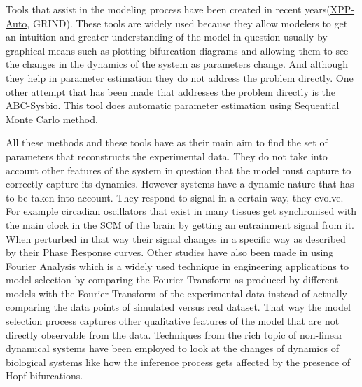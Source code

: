 \documentclass[12pt,a4paper,titlepage]{article}
\begin{document}
Tools that assist in the modeling process have been created in recent years(\href{http://www.math.pitt.edu/~bard/xpp/xpp.html}{XPP-Auto}, GRIND). These tools are widely used because they allow modelers to get an intuition and greater understanding of the model in question usually by graphical means such as plotting bifurcation diagrams and allowing them to see the changes in the dynamics of the system as parameters change. And although they help in parameter estimation they do not address the problem directly. One other attempt that has been made that addresses the problem directly is the ABC-Sysbio\cite{liebe2010abcpy}. This tool does automatic parameter estimation using Sequential Monte Carlo method.

All these methods and these tools have as their main aim to find the set of parameters that reconstructs the experimental data. They do not take into account other features of the system in question that the model must capture to correctly capture its dynamics. However systems have a dynamic nature that has to be taken into account. They respond to signal in a certain way, they evolve. For example circadian oscillators that exist in many tissues get synchronised with the main clock in the SCM of the brain by getting an entrainment signal from it. When perturbed in that way their signal changes in a specific way as described by their Phase Response curves\cite{pfeuty2011robust}. Other studies have also been made in using Fourier Analysis which is a widely used technique in engineering applications to model selection by comparing the Fourier Transform as produced by different models with the Fourier Transform of the experimental data instead of actually comparing the data points of simulated versus real dataset\cite{konopka2010gene}. That way the model selection process captures other qualitative features of the model that are not directly observable from the data. Techniques from the rich topic of non-linear dynamical systems have been employed to look at the changes of dynamics of biological systems like how the inference process gets affected by the presence of Hopf bifurcations\cite{kirk2008parameter}.
\end{document}
